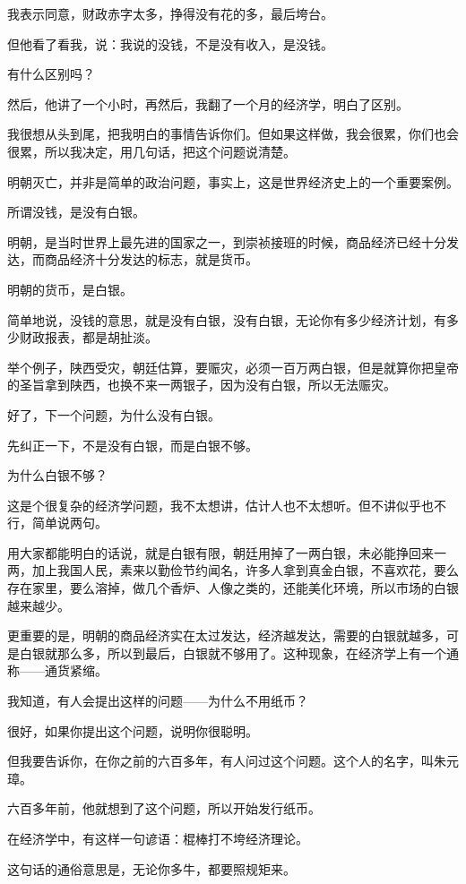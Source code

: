 \begin{multicols}{\theparacolNo}
		我表示同意，财政赤字太多，挣得没有花的多，最后垮台。

		但他看了看我，说：我说的没钱，不是没有收入，是没钱。

		有什么区别吗？

		然后，他讲了一个小时，再然后，我翻了一个月的经济学，明白了区别。

		我很想从头到尾，把我明白的事情告诉你们。但如果这样做，我会很累，你们也会很累，所以我决定，用几句话，把这个问题说清楚。

		明朝灭亡，并非是简单的政治问题，事实上，这是世界经济史上的一个重要案例。

		所谓没钱，是没有白银。

		明朝，是当时世界上最先进的国家之一，到崇祯接班的时候，商品经济已经十分发达，而商品经济十分发达的标志，就是货币。

		明朝的货币，是白银。

		简单地说，没钱的意思，就是没有白银，没有白银，无论你有多少经济计划，有多少财政报表，都是胡扯淡。

		举个例子，陕西受灾，朝廷估算，要赈灾，必须一百万两白银，但是就算你把皇帝的圣旨拿到陕西，也换不来一两银子，因为没有白银，所以无法赈灾。

		好了，下一个问题，为什么没有白银。

		先纠正一下，不是没有白银，而是白银不够。

		为什么白银不够？

		这是个很复杂的经济学问题，我不太想讲，估计人也不太想听。但不讲似乎也不行，简单说两句。

		用大家都能明白的话说，就是白银有限，朝廷用掉了一两白银，未必能挣回来一两，加上我国人民，素来以勤俭节约闻名，许多人拿到真金白银，不喜欢花，要么存在家里，要么溶掉，做几个香炉、人像之类的，还能美化环境，所以市场的白银越来越少。

		更重要的是，明朝的商品经济实在太过发达，经济越发达，需要的白银就越多，可是白银就那么多，所以到最后，白银就不够用了。这种现象，在经济学上有一个通称——通货紧缩。

		我知道，有人会提出这样的问题——为什么不用纸币？

		很好，如果你提出这个问题，说明你很聪明。

		但我要告诉你，在你之前的六百多年，有人问过这个问题。这个人的名字，叫朱元璋。

		六百多年前，他就想到了这个问题，所以开始发行纸币。

		在经济学中，有这样一句谚语：棍棒打不垮经济理论。

		这句话的通俗意思是，无论你多牛，都要照规矩来。


\end{multicols}
